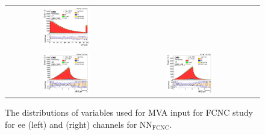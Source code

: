 \begin{figure}[ht]
\begin{center}
\begin{tabular}{ccc}
      \includegraphics[width=0.4\textwidth]{figures/tW/fig/FCNC_MVA_input/mumu/H_BSM_xj1b_dPt_l1_l2.png}\\
      \includegraphics[width=0.4\textwidth]{figures/tW/fig/FCNC_MVA_input/ee/H_BSM_xj1b_dR_ll_j1.png}&
      \includegraphics[width=0.4\textwidth]{figures/tW/fig/FCNC_MVA_input/mumu/H_BSM_xj1b_dR_ll_j1.png}\\
    \end{tabular}
    \caption{The distributions of variables used for MVA input for FCNC study for ee (left) and \mumu (right) channels for NN$_{\text{FCNC}}$.
    \label{fig:MVA_FCNC_1j1t_2}}
  \end{center}
\end{figure}
\clearpage

